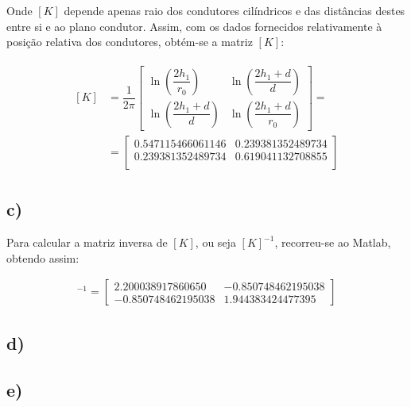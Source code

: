 \documentclass[portuguese, a4paper, fleqn]{article}
\begin{document}
	Onde $[K]$ depende apenas raio dos condutores cilíndricos e das distâncias destes entre si e ao plano condutor. Assim, com os dados fornecidos relativamente à posição relativa dos condutores, obtém-se a matriz $[K]$:

	\begin{align*}
		\begin{split}
		[K] &= \dfrac{1}{2\pi}
		\begin{bmatrix}
			\ln\left(\dfrac{2h_1}{r_0}\right) & \ln\left(\dfrac{2h_1 + d}{d}\right)  \\[1em]
			\ln\left(\dfrac{2h_1 + d}{d}\right) & \ln\left(\dfrac{2h_1 + d}{r_0}\right)
		\end{bmatrix} = \\
		&= \begin{bmatrix}
			0.547115466061146 & 0.239381352489734 \\
			0.239381352489734 & 0.619041132708855 \\
		\end{bmatrix}
		\end{split}
		\end{align*}

	\subsection{c)}

		Para calcular a matriz inversa de $[K]$, ou seja $[K]^{-1}$, recorreu-se ao Matlab, obtendo assim:

		\begin{align*}
			[K]^{-1} =
			\begin{bmatrix}
				2.200038917860650  & -0.850748462195038 \\
  				-0.850748462195038  & 1.944383424477395
			\end{bmatrix}
		\end{align*}

	\subsection{d)}



	\subsection{e)}

\end{document}
